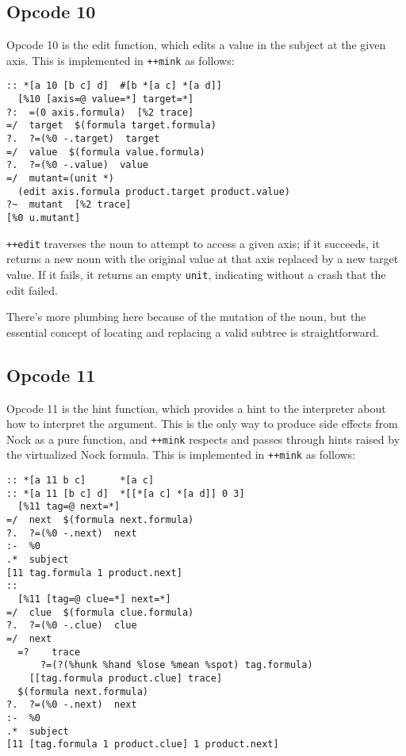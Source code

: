 \documentclass[twoside]{article}
\begin{document}
\subsection{Opcode 10}

Opcode 10 is the edit function, which edits a value in the subject at the given axis.  This is implemented in \lstinline[style=inlinecode]{++mink} as follows:

\begin{lstlisting}[style=listingcode]
:: *[a 10 [b c] d]  #[b *[a c] *[a d]]
  [%10 [axis=@ value=*] target=*]
?:  =(0 axis.formula)  [%2 trace]
=/  target  $(formula target.formula)
?.  ?=(%0 -.target)  target
=/  value  $(formula value.formula)
?.  ?=(%0 -.value)  value
=/  mutant=(unit *)
  (edit axis.formula product.target product.value)
?~  mutant  [%2 trace]
[%0 u.mutant]
\end{lstlisting}

\noindent
\lstinline[style=inlinecode]{++edit} traverses the noun to attempt to access a given axis; if it succeeds, it returns a new noun with the original value at that axis replaced by a new target value.  If it fails, it returns an empty \texttt{unit}, indicating without a crash that the edit failed.

There's more plumbing here because of the mutation of the noun, but the essential concept of locating and replacing a valid subtree is straightforward.

\subsection{Opcode 11}

Opcode 11 is the hint function, which provides a hint to the interpreter about how to interpret the argument.  This is the only way to produce side effects from Nock as a pure function, and \lstinline[style=inlinecode]{++mink} respects and passes through hints raised by the virtualized Nock formula.  This is implemented in \lstinline[style=inlinecode]{++mink} as follows:

\begin{lstlisting}[style=listingcode]
:: *[a 11 b c]      *[a c]
:: *[a 11 [b c] d]  *[[*[a c] *[a d]] 0 3]
  [%11 tag=@ next=*]
=/  next  $(formula next.formula)
?.  ?=(%0 -.next)  next
:-  %0
.*  subject
[11 tag.formula 1 product.next]
::
  [%11 [tag=@ clue=*] next=*]
=/  clue  $(formula clue.formula)
?.  ?=(%0 -.clue)  clue
=/  next
  =?    trace
      ?=(?(%hunk %hand %lose %mean %spot) tag.formula)
    [[tag.formula product.clue] trace]
  $(formula next.formula)
?.  ?=(%0 -.next)  next
:-  %0
.*  subject
[11 [tag.formula 1 product.clue] 1 product.next]
\end{lstlisting}
\end{document}
